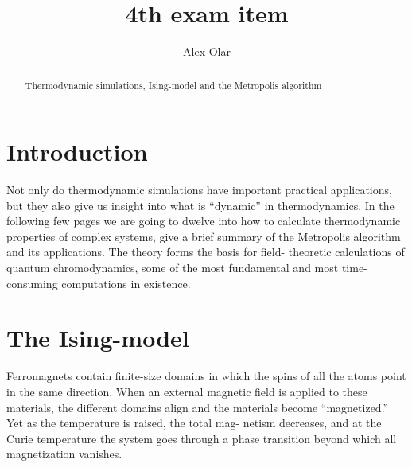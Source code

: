\documentclass[12pt]{article}
\theoremstyle{plain}
\begin{document}
\title{4th exam item}
\author{Alex Olar}

\maketitle


\begin{abstract}
    \centering
    
    Thermodynamic simulations, Ising-model and the Metropolis algorithm
\end{abstract}

\vfill

\tableofcontents

\newpage

\vspace{2mm}

\section{Introduction}

\vspace{2mm}

\par Not only do thermodynamic simulations
have important practical applications, but they also give us insight into what is “dynamic” in
thermodynamics. In the following few pages we are going
to dwelve into how to calculate thermodynamic properties of
complex systems, give a brief summary of the Metropolis algorithm and its 
applications. The theory forms the basis for field- theoretic calculations
of quantum chromodynamics, some of the most fundamental and most time-consuming
computations in existence. \cite{landau}

\vspace{2mm}

\section{The Ising-model}

\vspace{2mm}

\par Ferromagnets contain finite-size domains in which the spins of all the atoms point in the same
direction. When an external magnetic field is applied to these materials, the different domains
align and the materials become “magnetized.” Yet as the temperature is raised, the total mag-
netism decreases, and at the Curie temperature the system goes through a phase transition
beyond which all magnetization vanishes.
\end{document}
